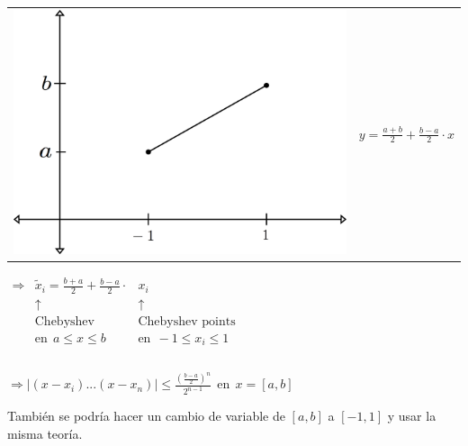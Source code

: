  
\begin{tabular}{cc}
\includegraphics[scale=0.65]{seccion9/graficos/G13-1.png} & $y = \frac{a+b}{2} + \frac{b-a}{2}\cdot x$ \\
\end{tabular}

\vspace*{4cm}

$
\begin{array}{lll}
                
\Rightarrow &  \displaystyle \tilde{x}_{i}  = \displaystyle \frac{b+a}{2} + \displaystyle \frac{b-a}{2} \cdot & x_{i} \\
& \uparrow &  \uparrow \\
& \text{Chebyshev} & \text{Chebyshev points} \\
& \text{en} \ \ a \leq x \leq b & \text{en} \ \ -1 \leq x_{i} \leq 1 \\
& & \\ 
\end{array}$

$\Rightarrow  |(x-x_{i})...(x-x_{n})|  \leq \displaystyle \frac{(\frac{b-a}{2})^n}{2^{n-1}} \ \ \text{en} \ \ x=[a,b]   $                


\begin{center}
 También se podría hacer un cambio de variable de $[a,b]$ a $[-1,1]$ y usar la misma teoría.
\end{center}

\pagebreak
